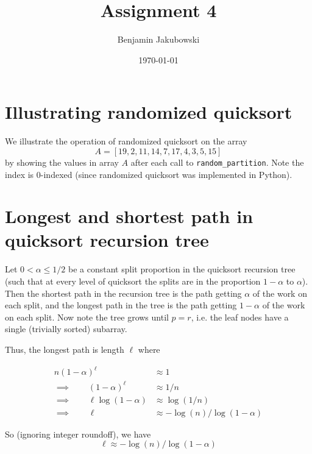 \documentclass[paper=a4, fontsize=11pt]{scrartcl} %
\title{	Assignment 4}
\author{Benjamin Jakubowski} %
\date{\normalsize\today} %
\numberwithin{equation}{section} %
\numberwithin{figure}{section} %
\numberwithin{table}{section} %
\begin{document}
\maketitle %

\section{Illustrating randomized quicksort}

We illustrate the operation of randomized quicksort on the array
\[A = [19, 2, 11, 14, 7, 17, 4, 3, 5, 15]\]
by showing the values in array $A$ after each call to \texttt{random\_partition}. Note the index is 0-indexed (since randomized quicksort was implemented in Python).



\section{Longest and shortest path in quicksort recursion tree}

Let $0 < \alpha \leq 1/2$ be a constant split proportion in the quicksort recursion tree (such that at every level of quicksort the splits are in
the proportion $1 - \alpha$ to $\alpha$). Then the shortest path in the recursion tree is the path getting $\alpha$ of the work on each split, and the longest path in the tree is the path getting $1 - \alpha$ of the work on each split. Now note the tree grows until $p = r$, i.e. the leaf nodes have a single (trivially sorted) subarray.

Thus, the longest path is length $\ell$ where

\begin{align*}
n (1 - \alpha)^\ell & \approx 1  \\
\implies \qquad{} (1 - \alpha)^\ell & \approx 1/n  \\
\implies \qquad{} \ell \log(1 - \alpha) & \approx \log(1/n) \\
\implies \qquad{} \ell & \approx -\log(n)/\log(1 - \alpha) 
\end{align*}

So (ignoring integer roundoff), we have
\[\ell \approx -\log(n)/\log(1 - \alpha)\]
\end{document}
